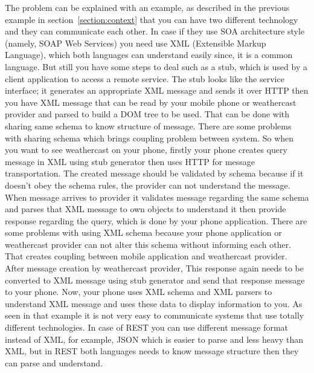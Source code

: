 The problem can be explained with an example, as described in the previous example in section \ref{section:context} that you can have two different technology and they can communicate each other. In case if they use SOA architecture style (namely, SOAP Web Services) you need use XML (Extensible Markup Language), which both languages can understand easily since, it is a common language. But still you have some steps to deal such as a stub, which is used by a client application to access a remote service. The stub looks like the service interface\citep{thesis:introduction3}; it generates an appropriate XML message and sends it over HTTP then you have XML message that can be read by your mobile phone or weathercast provider and parsed to build a DOM tree to be used. That can be done with sharing same schema to know structure of message. There are some problems with sharing schema which brings coupling problem between system. So when you want to see weathercast on your phone, firstly your phone creates query message in XML using stub generator then uses HTTP for message transportation. The created message should be validated by schema because if it doesn't obey the schema rules, the provider can not understand the message. When message arrives to provider it validates message regarding the same schema and parses that XML message to own objects to understand it then provide response regarding the query, which is done by your phone application. There are some problems with using XML schema because your phone application or weathercast provider can not alter this schema without informing each other. That creates coupling between mobile application and weathercast provider. After message creation by weathercast provider, This response again needs to be converted to XML message using stub generator and send that response message to your phone. Now, your phone uses XML schema and XML parsers to understand XML message and uses these data to display information to you. As seen in that example it is not very easy to communicate systems that use totally different technologies. In case of REST you can use different message format instead of XML, for example, JSON which is easier to parse and less heavy than XML, but in REST  both languages needs to know message structure then they can parse and understand.

